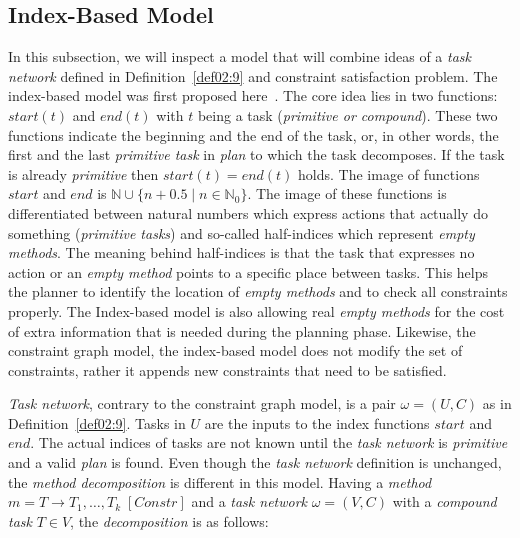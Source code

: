 \begin{example}\label{ex03:7}
\end{example}

\subsection{Index-Based Model}

\medskip\noindent
In this subsection, we will inspect a model that will combine ideas of a \emph{task network} defined in Definition~\ref{def02:9} and constraint satisfaction problem. The index-based model was first proposed here~\cite{ondrckova2023semantics}. The core idea lies in two functions: $start(t)$ and $end(t)$ with $t$ being a task (\emph{primitive or compound}). These two functions indicate the beginning and the end of the task, or, in other words, the first and the last \emph{primitive task} in \emph{plan} to which the task decomposes. If the task is already \emph{primitive} then $start(t) = end(t)$ holds. The image of functions $start$ and $end$ is $\mathbb{N} \cup \{n + 0.5 \; | \; n \in \mathbb{N}_0\}$. The image of these functions is differentiated between natural numbers which express actions that actually do something (\emph{primitive tasks}) and so-called half-indices which represent \emph{empty methods}. The meaning behind half-indices is that the task that expresses no action or an \emph{empty method} points to a specific place between tasks. This helps the planner to identify the location of \emph{empty methods} and to check all constraints properly. The Index-based model is also allowing real \emph{empty methods} for the cost of extra information that is needed during the planning phase. Likewise, the constraint graph model, the index-based model does not modify the set of constraints, rather it appends new constraints that need to be satisfied.

\medskip\noindent
\emph{Task network}, contrary to the constraint graph model, is a pair $\omega = (U, C)$ as in Definition~\ref{def02:9}. Tasks in $U$ are the inputs to the index functions $start$ and $end$. The actual indices of tasks are not known until the \emph{task network} is \emph{primitive} and a valid \emph{plan} is found. Even though the \emph{task network} definition is unchanged, the \emph{method decomposition} is different in this model. Having a \emph{method} $m = T \rightarrow T_1, \dots, T_k \; [Constr]$ and a \emph{task network} $\omega = (V, C)$ with a \emph{compound task} $T \in V$, the \emph{decomposition} is as follows:

